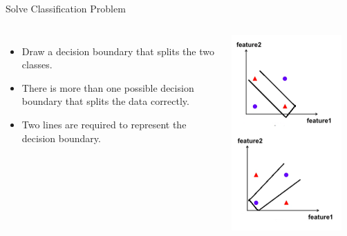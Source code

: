 \documentclass[aspectratio=169,13pt,usenames,dvipsnames]{beamer}
\begin{document}
\begin{frame}{ Solve Classification Problem }
\begin{columns}
\begin{itemize}
  \item Draw a decision boundary that splits the two classes.
  \item There is more than one possible decision boundary that splits the data correctly.
  \item Two lines are required to represent the decision boundary.
\end{itemize}
\includegraphics[width=0.9\textwidth, height=0.7\textheight]{Images/AIML_MLP_IMG10.png}
\end{columns}
\end{frame}
\end{document}
